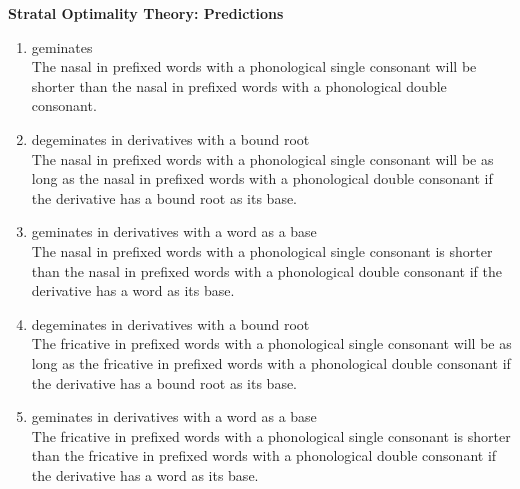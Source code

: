 \textbf{Stratal Optimality Theory: Predictions}

\begin{enumerate}
	
	\item {} geminates \\
	The nasal in prefixed words with a phonological single consonant will be shorter than the nasal in  prefixed words with a phonological double consonant. 
		
	\item{} degeminates in derivatives with a bound root\\
	 The nasal in prefixed words with a phonological single consonant will be as long as the nasal in  prefixed words with a phonological double consonant if  the derivative has a bound root as its base.

	\item {} geminates in derivatives with a word as a base \\
	The nasal in prefixed words with a phonological single consonant is shorter than the nasal in prefixed words with a phonological double consonant if  the derivative has a word as its base.



	
	\item {} degeminates in derivatives with a bound root\\
	The fricative in prefixed words with a phonological single consonant will be as long as the fricative in prefixed words with a phonological double consonant if  the derivative has a bound root as its base.

	\item {} geminates in derivatives with a word as a base \\
	The fricative in prefixed words with a phonological single consonant is shorter than the fricative in prefixed words with a phonological double consonant if  the derivative has a word as its base.


\end{enumerate}
